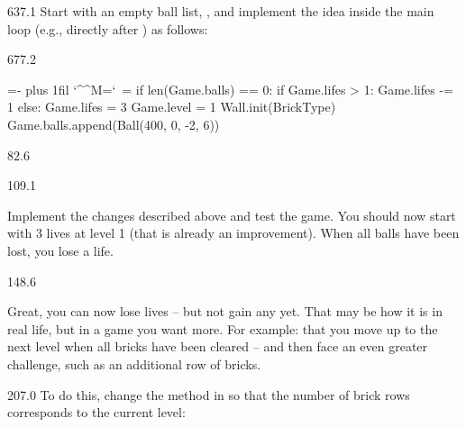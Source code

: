 \documentclass{aslab}
\makeatletter
\newcommand*\kw[1]{\textcolor{codeorange}{#1}}
\newcommand*\fn[1]{\textcolor{codecyan}{#1}}
\newcommand*\num[1]{\textcolor{codered}{#1}}
\newenvironment{pycode}{\par\ttfamily\hyphenchar\font=-1
  \lineskiplimit=-\maxdimen\lineskip=0pt\parindent=0pt
  \parfillskip=0pt plus 1fil\relax
  \catcode`\^^M=\active\catcode`\ =\active\py@setup\py@gobble}{}
\makeatother
\begin{document}
\begin{region}[pitch=13.5]{637.1}
Start with an empty ball list, , and implement the
idea inside the main loop (e.g., directly after ) as
follows:
\end{region}

\begin{region}[]{677.2}
\begin{pycode}
    \kw{if} \fn{len}(Game.balls) == \num{0}:
        \kw{if} Game.lifes > \num{1}:
            Game.lifes -= \num{1}
        \kw{else}:
            Game.lifes = \num{3}
            Game.level = \num{1}
            Wall.init(BrickType)
        Game.balls.append(Ball(\num{400}, \num{0}, -\num{2}, \num{6}))
\end{pycode}
\end{region}

\nextpage
\begin{region}{82.6}
\end{region}

\begin{region}[pitch=13.15]{109.1}
\begin{tasks}
\item[1.] Implement the changes described above and test the game. You
  should now start with 3 lives at level 1 (that is already an
  improvement). When all balls have been lost, you lose a life.
\end{tasks}
\end{region}

\begin{region}[pitch=13.17]{148.6}
\begin{tasks}[start=2]
\item[2.] Great, you can now lose lives -- but not gain any yet. That may be
  how it is in real life, but in a game you want more. For example: that you
  move up to the next level when all bricks have been cleared -- and then
  face an even greater challenge, such as an additional row of bricks.
\end{tasks}
\end{region}

\begin{region}[x=74.7,right=0,pitch=13.3]{207.0}
To do this, change the  method in  so that the
number of brick rows corresponds to the current level:
\end{region}
\end{document}

